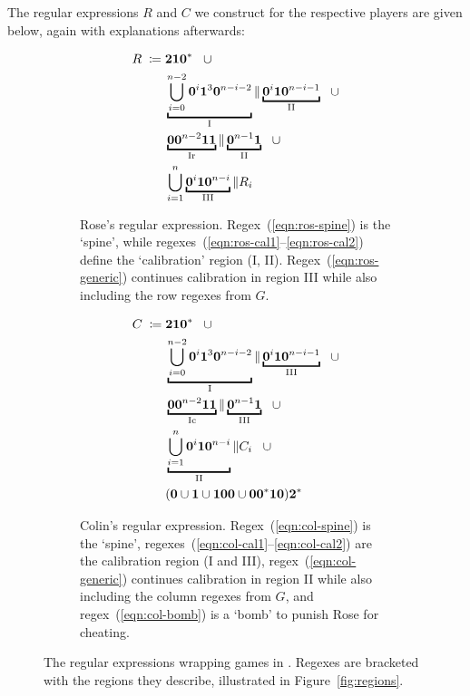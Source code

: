 \documentclass{article}
\newcommand{\0}{\mathbf{0}}
\newcommand{\1}{\mathbf{1}}
\newcommand{\2}{\mathbf{2}}
\newcounter{row}
\newcounter{col}
\theoremstyle{plain}
\theoremstyle{definition}
\begin{document}
The regular expressions $R$ and $C$ we construct for the respective players are given below, again with explanations afterwards:
\begin{figure}[H]
  \centering
  \begin{subfigure}[t]{0.4\textwidth}
    \begin{align}
      R \;\coloneqq\; & \2\1\0^* \;\;\mathrel\cup \label{eqn:ros-spine}              \\
                      &
      \underbracket{\bigcup\limits_{i=0}^{n-2} \0^i\1^3\0^{n-i-2}}_{\rm I}
      \|
      \underbracket{\0^i \1 \0^{n-i-1}}_{\rm II}\;\;\mathrel\cup\label{eqn:ros-cal1} \\
                      &
      \underbracket{\0 \0^{n-2} \1\1}_{\rm Ir}
      \|
      \underbracket{\0^{n-1}\1}_{\rm II} \;\;\mathrel \cup \label{eqn:ros-cal2}      \\
                      &
      \bigcup\limits_{i=1}^n \underbracket{\0^i \1 \0^{n-i}}_{\rm III} \| R_i \label{eqn:ros-generic}
    \end{align}
    \caption{Rose's regular expression. Regex~(\ref{eqn:ros-spine}) is the `spine', while regexes~(\ref{eqn:ros-cal1}--\ref{eqn:ros-cal2}) define the `calibration' region (I, II).  Regex~(\ref{eqn:ros-generic}) continues calibration in region III while also including the row regexes from $G$.}
  \end{subfigure}
  \qquad
  \begin{subfigure}[t]{0.4\textwidth}
    \begin{align}
      C \;\coloneqq\; & \2\1\0^* \;\;\mathrel\cup \label{eqn:col-spine}                 \\
                      &
      \underbracket{\bigcup\limits_{i=0}^{n-2} \0^i \1^3 \0^{n-i-2}}_{\rm I}
      \|
      \underbracket{\0^i \1 \0^{n-i-1}}_{\rm III} \;\;\mathrel\cup \label{eqn:col-cal1} \\
                      &
      \underbracket{\0 \0^{n-2} \1\1}_{\rm Ic} \|
      \underbracket{\0^{n-1}\1}_{\rm III} \;\;\mathrel\cup\label{eqn:col-cal2}          \\
                      &
      \underbracket{\bigcup\limits_{i=1}^{n} \0^i \1 \0^{n-i}}_{\rm II}
      \|
      C_i \;\;\mathrel\cup \label{eqn:col-generic}                                      \\
                      &
      (\0 \cup \1 \cup \1\0\0\cup \0\0^*\1\0)\2^*\label{eqn:col-bomb}
    \end{align}
    \caption{Colin's regular expression. Regex~(\ref{eqn:col-spine}) is the `spine', regexes~(\ref{eqn:col-cal1}--\ref{eqn:col-cal2}) are the calibration region (I and III), regex~(\ref{eqn:col-generic}) continues calibration in region II while also including the column regexes from $G$, and regex~(\ref{eqn:col-bomb}) is a `bomb' to punish Rose for cheating.}
  \end{subfigure}
  \caption{The regular expressions wrapping games in . Regexes are bracketed with the regions they describe, illustrated in Figure~\ref{fig:regions}.}
\end{figure}
\end{document}
